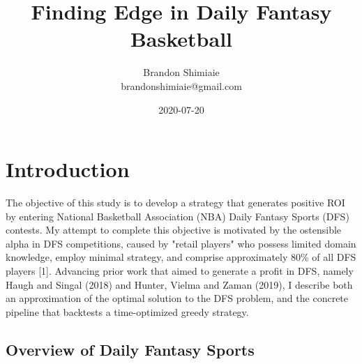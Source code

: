 \documentclass{article}
\title{Finding Edge in Daily Fantasy Basketball}
\author{Brandon Shimiaie \\ brandonshimiaie@gmail.com}
\date{2020-07-20}
\begin{document}
\maketitle
{}
\newpage
{}

\section{Introduction}

The objective of this study is to develop a strategy that generates positive ROI by entering National Basketball Association (NBA) Daily Fantasy Sports (DFS) contests. My attempt to complete this objective is motivated by the ostensible alpha in DFS competitions, caused by "retail players" who possess limited domain knowledge, employ minimal strategy, and comprise approximately 80\% of all DFS players [1]. Advancing prior work that aimed to generate a profit in DFS, namely Haugh and Singal (2018) and Hunter, Vielma and Zaman (2019), I describe both an approximation of the optimal solution to the DFS problem, and the concrete pipeline that backtests a time-optimized greedy strategy.

\subsection{Overview of Daily Fantasy Sports}
\end{document}
